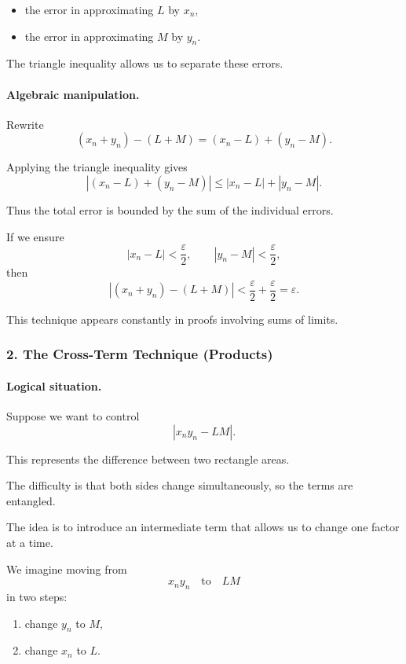 \begin{itemize}
\item the error in approximating $L$ by $x_n$,
\item the error in approximating $M$ by $y_n$.
\end{itemize}

The triangle inequality allows us to separate these errors.

\paragraph{Algebraic manipulation.}

Rewrite
\[
(x_n + y_n) - (L + M)
=
(x_n - L) + (y_n - M).
\]

Applying the triangle inequality gives
\[
|(x_n - L) + (y_n - M)|
\le
|x_n - L| + |y_n - M|.
\]

Thus the total error is bounded by the sum of the individual errors.

If we ensure
\[
|x_n - L| < \frac{\varepsilon}{2},
\qquad
|y_n - M| < \frac{\varepsilon}{2},
\]
then
\[
|(x_n + y_n) - (L + M)|
<
\frac{\varepsilon}{2} + \frac{\varepsilon}{2}
=
\varepsilon.
\]

This technique appears constantly in proofs involving sums of limits.

\bigskip

\subsubsection*{2. The Cross-Term Technique (Products)}

\paragraph{Logical situation.}

Suppose we want to control
\[
|x_n y_n - LM|.
\]

This represents the difference between two rectangle areas.

The difficulty is that both sides change simultaneously, so the terms
are entangled.

The idea is to introduce an intermediate term that allows us to change
one factor at a time.

We imagine moving from
\[
x_n y_n
\quad\text{to}\quad
LM
\]
in two steps:

\begin{enumerate}
\item change $y_n$ to $M$,
\item change $x_n$ to $L$.
\end{enumerate}

